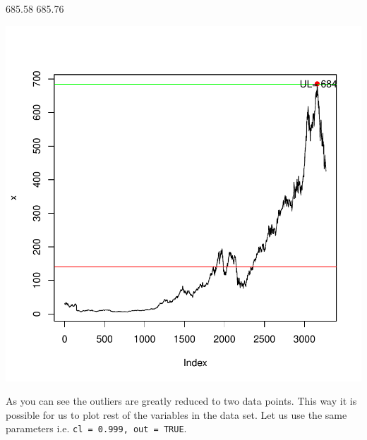 \documentclass{article}
\begin{document}
\begin{Schunk}
\begin{Soutput}
[1] 685.58 685.76
\end{Soutput}
\end{Schunk}
\includegraphics{anadetect-010}

As you can see the outliers are greatly reduced to two data points. This way it is possible for us to plot rest of the variables in the data set. Let us use the same parameters i.e. \texttt{cl = 0.999, out = TRUE}. 
\end{document}
